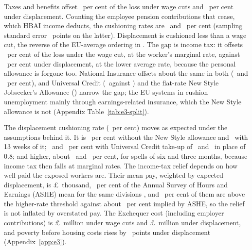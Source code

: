 Taxes and benefits offset \EThreeWageTaxBenRatePct\ per cent of the
loss under wage cuts and \EThreeDispTaxBenRatePct\ per cent under
displacement. Counting the employee pension contributions that cease,
which HBAI income deducts, the cushioning rates are
\EThreeWageRatePct\ and \EThreeDispRatePct\ per cent (sampling
standard error \EThreeDispSamplingSe\ points on the latter).
Displacement is cushioned less than a wage cut, the reverse of the
EU-average ordering in \citet{dolls2012}. The gap is income tax: it offsets \EThreeWageTaxOfGrossPct\ per cent of the loss under the wage
cut, at the worker's marginal rate, against \EThreeDispTaxOfGrossPct\
per cent under displacement, at the lower average rate, because the
personal allowance is forgone too. National Insurance offsets about
the same in both (\EThreeWageNiOfGrossPct\ and
\EThreeDispNiOfGrossPct\ per cent), and Universal Credit
(\EThreeDispUcOfGrossPct\ against \EThreeWageUcOfGrossPct) and the
flat-rate New Style Jobseeker's Allowance
(\EThreeDispJsaContribOfGrossPct) narrow the gap; the EU systems in
\citet{dolls2012} cushion unemployment mainly through
earnings-related insurance, which the New Style allowance is not
(Appendix Table~\ref{tab:e3-split}).

The displacement cushioning rate (\EThreeDispRatePct\ per cent) moves
as expected under the assumptions behind it. It is
\EThreeDispNoJsaRatePct\ per cent without
the New Style allowance and \EThreeSensJsaThirteenRatePct\ with 13
weeks of it; \EThreeSensTakeupLowRatePct\ and
\EThreeSensTakeupHighRatePct\ per cent with Universal Credit take-up
of \EThreeSensTakeupLow\ and \EThreeSensTakeupHigh\ in place of 0.8;
and higher, about \EThreeSensSixMonthAnnualRatePct\ and
\EThreeSensThreeMonthAnnualRatePct\ per cent, for spells of six and
three months, because income tax then falls at marginal rates.
The income-tax relief depends on how well paid the exposed workers
are. Their mean pay, weighted by expected displacement, is
\pounds\EThreeAsheModelMeanK\ thousand,
\EThreeAsheModelOverAsheMeanPct\ per cent of the Annual Survey of Hours and Earnings (ASHE) mean for the
same divisions \citep{ashe}, and \EThreeHigherRateSharePct\ per cent
of them are above the higher-rate threshold against about
\EThreeAsheHigherRateSharePct\ per cent implied by ASHE, so the
relief is not inflated by overstated pay. The Exchequer cost (including employer contributions) is
\pounds\EThreeWageExchequerM\ million under wage cuts and
\pounds\EThreeDispExchequerM\ million under displacement, and poverty
before housing costs rises by \EThreeDispPovertyPp\ points under
displacement (Appendix~\ref{app:e3}).

